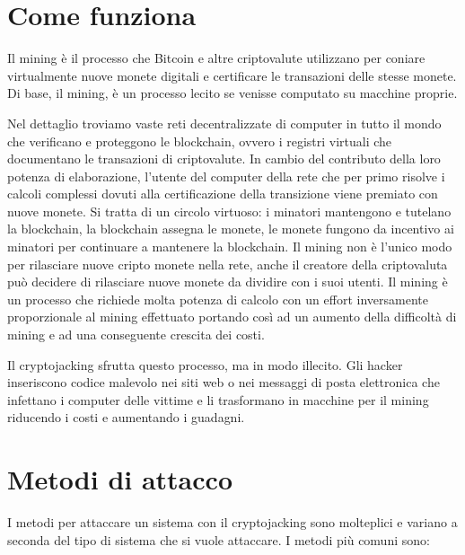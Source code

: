 \documentclass[12pt,a4paper]{article}
\begin{document}
\newpage

\section{Come funziona}
Il mining è il processo che Bitcoin e altre criptovalute utilizzano per coniare
virtualmente nuove monete digitali e certificare le transazioni delle stesse
monete. Di base, il mining, è un processo lecito se venisse computato su macchine 
proprie.

Nel dettaglio troviamo vaste reti decentralizzate di computer in tutto il mondo
che verificano e proteggono le blockchain, ovvero i registri virtuali che
documentano le transazioni di criptovalute. In cambio del contributo della loro
potenza di elaborazione, l'utente del computer della rete che per primo risolve
i calcoli complessi dovuti alla certificazione della transizione viene premiato
con nuove monete. Si tratta di un circolo virtuoso: i minatori mantengono e
tutelano la blockchain, la blockchain assegna le monete, le monete fungono da
incentivo ai minatori per continuare a mantenere la blockchain. Il mining non è
l'unico modo per rilasciare nuove cripto monete nella rete, anche il creatore
della criptovaluta può decidere di rilasciare nuove monete da dividire con i
suoi utenti. Il mining è un processo che richiede molta potenza di calcolo con
un effort inversamente proporzionale al mining effettuato portando così ad un
aumento della difficoltà di mining e ad una conseguente crescita dei costi.

Il cryptojacking sfrutta questo processo, ma in modo illecito. Gli hacker
inseriscono codice malevolo nei siti web o nei messaggi di posta elettronica che
infettano i computer delle vittime e li trasformano in macchine per il mining
riducendo i costi e aumentando i guadagni.

\newpage

\section{Metodi di attacco}
I metodi per attaccare un sistema con il cryptojacking sono molteplici e variano
a seconda del tipo di sistema che si vuole attaccare. I metodi più comuni sono:
\end{document}
